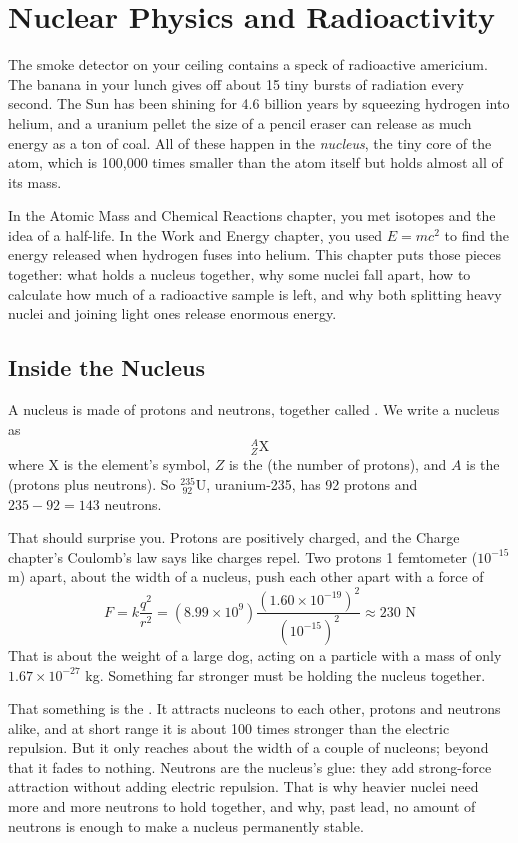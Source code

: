 \chapter{Nuclear Physics and Radioactivity}

The smoke detector on your ceiling contains a speck of radioactive americium. The banana in
your lunch gives off about 15 tiny bursts of radiation every second. The Sun has been shining
for 4.6 billion years by squeezing hydrogen into helium, and a uranium pellet the size of a
pencil eraser can release as much energy as a ton of coal. All of these happen in the
\emph{nucleus}, the tiny core of the atom, which is 100,000 times smaller than the atom itself
but holds almost all of its mass.

In the Atomic Mass and Chemical Reactions chapter, you met isotopes and the idea of a half-life.
In the Work and Energy chapter, you used $E = mc^2$ to find the energy released when hydrogen
fuses into helium. This chapter puts those pieces together: what holds a nucleus together, why
some nuclei fall apart, how to calculate how much of a radioactive sample is left, and why both
splitting heavy nuclei and joining light ones release enormous energy.

\section{Inside the Nucleus}
A nucleus is made of protons and neutrons, together called . We write a nucleus
as
$$^{A}_{Z}\text{X}$$
where X is the element's symbol, $Z$ is the  (the number of protons), and $A$
is the  (protons plus neutrons). So $^{235}_{\ 92}\text{U}$, uranium-235, has
92 protons and $235 - 92 = 143$ neutrons.

That should surprise you. Protons are positively charged, and the Charge chapter's Coulomb's law
says like charges repel. Two protons 1 femtometer ($10^{-15}$ m) apart, about the width of a nucleus,
push each other apart with a force of
$$F = k\frac{q^2}{r^2} = (8.99 \times 10^9)\frac{(1.60 \times 10^{-19})^2}{(10^{-15})^2} \approx 230 \text{ N}$$
That is about the weight of a large dog, acting on a particle with a mass of only
$1.67 \times 10^{-27}$ kg. Something far stronger must be holding the nucleus together.

That something is the . It attracts nucleons to each other, protons and
neutrons alike, and at short range it is about 100 times stronger than the electric repulsion. But
it only reaches about the width of a couple of nucleons; beyond that it fades to nothing. Neutrons are
the nucleus's glue: they add strong-force attraction without adding electric repulsion. That is why
heavier nuclei need more and more neutrons to hold together, and why, past lead, no amount of neutrons
is enough to make a nucleus permanently stable.

